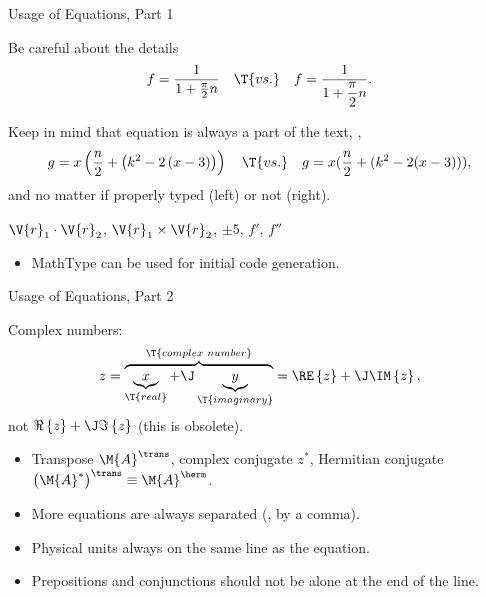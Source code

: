 \documentclass[xcolor=dvipsnames, aspectratio=169, handout, intlimits]{beamer}
\begin{document}
\begin{frame}{Usage of Equations, Part 1}

\vspace{-0.5cm}
Be careful about the details
\begin{equation*}
f = \frac{1}{1 + \frac{\pi}{2}n} \quad \T{vs.} \quad f = \frac{1}{1 + \displaystyle\frac{\pi}{2}n}.
\end{equation*}

\vspace{0.25cm}
Keep in mind that equation is always a part of the text, \ie{},
\begin{equation*}
g = x \left(\frac{n}{2} + \left(k^2 - 2 \left(x - 3\right)\right)\right) \quad \T{vs.} \quad g = x (\frac{n}{2} + (k^2 - 2 (x - 3))),
\end{equation*}
and no matter if properly typed (left) or not (right).

\vspace{0.25cm}
$\V{r}_1 \cdot \V{r}_2$, $\V{r}_1 \times \V{r}_2$, $\pm 5$, $f'$, $f''$

\begin{itemize}
	\item MathType can be used for initial code generation.
\end{itemize}

\end{frame}

\begin{frame}{Usage of Equations, Part 2}

\vspace{-0.5cm}
Complex numbers:
\begin{equation*}
z = \overbrace{
	\underbrace{x}_\T{real} + \J
	\underbrace{y}_\T{imaginary}
}^\T{complex\,\,number} = \RE \left\{z\right\} + \J \IM \left\{z\right\},
\end{equation*}
not $\Re\left\{z\right\} + \J \Im\left\{z\right\}$ (this is obsolete).

\vspace{0.25cm}
\begin{itemize}
	\item<2-> Transpose $\M{A}^\trans$, complex conjugate $z^\ast$, Hermitian conjugate $\left(\M{A}^\ast\right)^\trans \equiv \M{A}^\herm$.
	\item<3-> More equations are always separated (\eg{}, by a comma).
	\item<4-> Physical units always on the same line as the equation.
	\item<5-> Prepositions and conjunctions should not be alone at the end of the line.
\end{itemize}


\end{frame}
\end{document}
